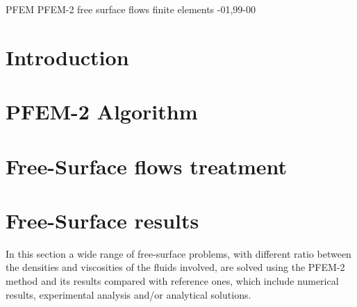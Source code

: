 \documentclass[review]{elsarticle}
\begin{document}
\begin{frontmatter}
\begin{keyword}
PFEM PFEM-2 free surface flows finite elements
-01\sep  99-00
\end{keyword}

\end{frontmatter}

\linenumbers
\fboxsep=0mm%

\section{Introduction}\label{Intro}



\section{PFEM-2 Algorithm}\label{PFEM_Algorithm}


\section{Free-Surface flows treatment}\label{Free_surface}



% 

\section{Free-Surface results}\label{FS_results}

In this section a wide range of free-surface problems, with different ratio between the densities and viscosities of the fluids involved, are solved using the PFEM-2 method and its results compared with reference ones, which include numerical results, experimental analysis and/or analytical solutions.
\end{document}
